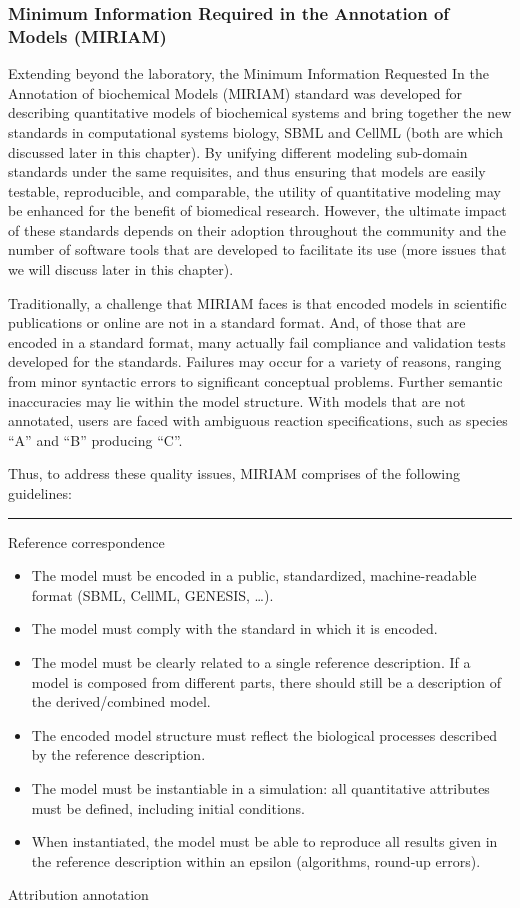 \documentclass[]{article}
\begin{document}
\subsubsection{Minimum Information Required in the Annotation of Models
(MIRIAM)}

Extending beyond the laboratory, the Minimum Information Requested In
the Annotation of biochemical Models (MIRIAM) standard
\autocite{novere2005minimum} \autocite{le2006model} was developed for
describing quantitative models of biochemical systems and bring together
the new standards in computational systems biology, SBML and CellML
(both are which discussed later in this chapter). By unifying different
modeling sub-domain standards under the same requisites, and thus
ensuring that models are easily testable, reproducible, and comparable,
the utility of quantitative modeling may be enhanced for the benefit of
biomedical research. However, the ultimate impact of these standards
depends on their adoption throughout the community and the number of
software tools that are developed to facilitate its use (more issues
that we will discuss later in this chapter).

Traditionally, a challenge that MIRIAM faces is that encoded models in
scientific publications or online are not in a standard format. And, of
those that are encoded in a standard format, many actually fail
compliance and validation tests developed for the standards. Failures
may occur for a variety of reasons, ranging from minor syntactic errors
to significant conceptual problems. Further semantic inaccuracies may
lie within the model structure. With models that are not annotated,
users are faced with ambiguous reaction specifications, such as species
``A'' and ``B'' producing ``C''.

Thus, to address these quality issues, MIRIAM comprises of the following
guidelines:

\begin{center}\rule{3in}{0.4pt}\end{center}

Reference correspondence

\begin{itemize}
\item
  The model must be encoded in a public, standardized, machine-readable
  format (SBML, CellML, GENESIS, \ldots{}).
\item
  The model must comply with the standard in which it is encoded.
\item
  The model must be clearly related to a single reference description.
  If a model is composed from different parts, there should still be a
  description of the derived/combined model.
\item
  The encoded model structure must reflect the biological processes
  described by the reference description.
\item
  The model must be instantiable in a simulation: all quantitative
  attributes must be defined, including initial conditions.
\item
  When instantiated, the model must be able to reproduce all results
  given in the reference description within an epsilon (algorithms,
  round-up errors).
\end{itemize}
Attribution annotation
\end{document}
